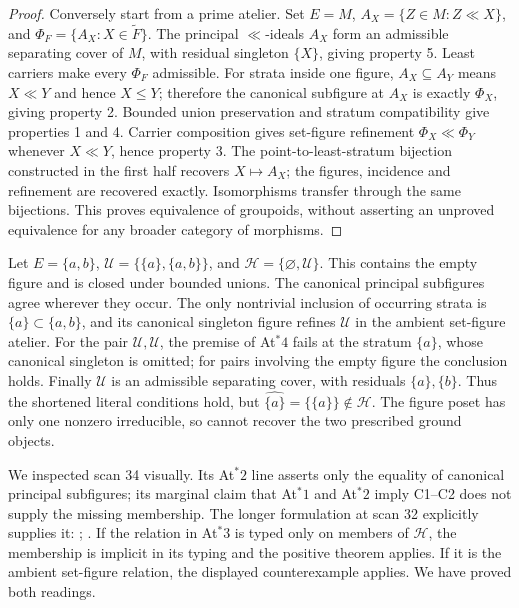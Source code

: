 \begin{proof}
Conversely start from a prime atelier. Set \(E=M\),
\(A_X=\{Z\in M:Z\ll X\}\), and
\(\Phi_F=\{A_X:X\in\widetilde F\}\).
The principal \(\ll\)-ideals \(A_X\) form an admissible separating
cover of \(M\), with residual singleton \(\{X\}\), giving property 5.
Least carriers make every \(\Phi_F\) admissible. For strata inside
one figure, \(A_X\subseteq A_Y\) means \(X\ll Y\) and hence
\(X\leq Y\); therefore the canonical subfigure at \(A_X\) is
exactly \(\Phi_X\), giving property 2. Bounded union preservation
and stratum compatibility give properties 1 and 4.
Carrier composition gives set-figure refinement
\(\Phi_X\ll\Phi_Y\) whenever \(X\ll Y\), hence property 3.
The point-to-least-stratum bijection constructed in the first half
recovers \(X\mapsto A_X\); the figures, incidence and refinement
are recovered exactly. Isomorphisms transfer through the same
bijections. This proves equivalence of groupoids, without asserting
an unproved equivalence for any broader category of morphisms.
\end{proof}

\begin{counterexample}
\label{SA21-B-Atstar-literal}
Let \(E=\{a,b\}\),
\(\mathscr U=\{\{a\},\{a,b\}\}\), and
\(\mathscr H=\{\varnothing,\mathscr U\}\).
This contains the empty figure and is closed under bounded unions.
The canonical principal subfigures agree wherever they occur.
The only nontrivial inclusion of occurring strata is
\(\{a\}\subset\{a,b\}\), and its canonical singleton figure
refines \(\mathscr U\) in the ambient set-figure atelier.
For the pair \(\mathscr U,\mathscr U\), the premise of At\(^*4\)
fails at the stratum \(\{a\}\), whose canonical singleton is
omitted; for pairs involving the empty figure the conclusion
holds. Finally \(\mathscr U\) is an admissible separating cover,
with residuals \(\{a\},\{b\}\).
Thus the shortened literal conditions hold, but
\(\widehat{\{a\}}=\{\{a\}\}\notin\mathscr H\).
The figure poset has only one nonzero irreducible, so cannot
recover the two prescribed ground objects.
\end{counterexample}

We inspected scan 34 visually. Its At\(^*2\) line asserts only the
equality of canonical principal subfigures; its marginal claim that
At\(^*1\) and At\(^*2\) imply C1--C2 does not supply the missing
membership. The longer formulation at scan 32 explicitly supplies it:
;
.
If the relation in At\(^*3\) is typed only on members of
\(\mathscr H\), the membership is implicit in its typing and the
positive theorem applies. If it is the ambient set-figure relation,
the displayed counterexample applies. We have proved both readings.


